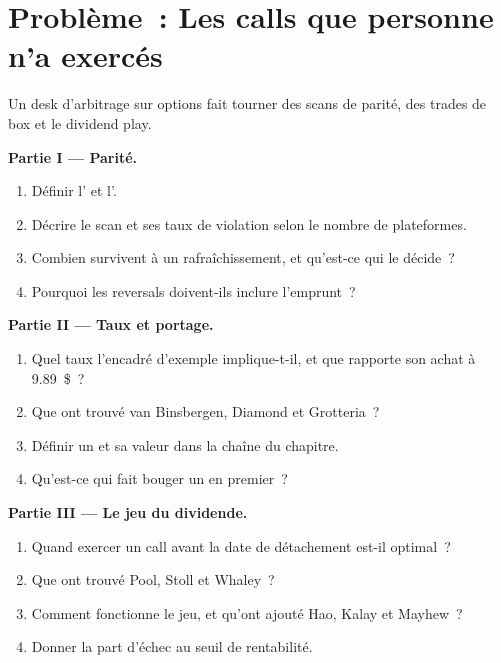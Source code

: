 \section{Problème~: Les calls que personne n'a exercés}

\begin{problem}\label{pb:hf:options-cross-venue-and-volatility-arbitrage-at-speed:1}
Un desk d'arbitrage sur options fait tourner des scans de parité, des trades de box et le dividend play.

\medskip\noindent\textbf{Partie I --- Parité.}
\begin{enumerate}
\item Définir l' et l'.
\item Décrire le scan et ses taux de violation selon le nombre de plateformes.
\item Combien survivent à un rafraîchissement, et qu'est-ce qui le décide~?
\item Pourquoi les reversals doivent-ils inclure l'emprunt~?
\end{enumerate}

\medskip\noindent\textbf{Partie II --- Taux et portage.}
\begin{enumerate}[resume]
\item Quel taux l'encadré d'exemple implique-t-il, et que rapporte son achat à 9.89~\$~?
\item Que ont trouvé van Binsbergen, Diamond et Grotteria~?
\item Définir un  et sa valeur dans la chaîne du chapitre.
\item Qu'est-ce qui fait bouger un  en premier~?
\end{enumerate}

\medskip\noindent\textbf{Partie III --- Le jeu du dividende.}
\begin{enumerate}[resume]
\item Quand exercer un call avant la date de détachement est-il optimal~?
\item Que ont trouvé Pool, Stoll et Whaley~?
\item Comment fonctionne le jeu, et qu'ont ajouté Hao, Kalay et Mayhew~?
\item Donner la part d'échec au seuil de rentabilité.
\end{enumerate}


\end{problem}
